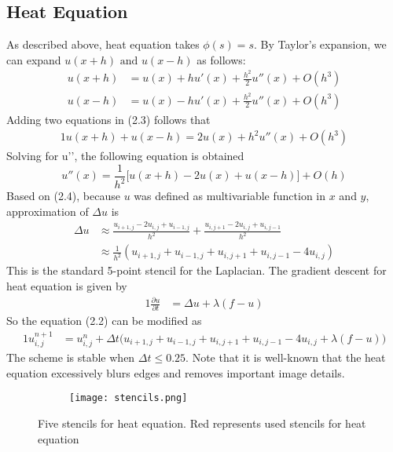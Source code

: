 \documentclass[12pt]{report}
\begin{document}
\begin{tableofcontents}
			\section{Heat Equation}
As described above, heat equation takes $\phi(s)=s$. By Taylor's expansion, we can expand $u(x+h)$ $\text{and}$ $u(x-h)$ as follows:
				\begin{equation}
                \begin{split}
\displaystyle u(x+h) &= u(x) + hu'(x) + \frac{h^2}{2}u''(x) + O(h^3) \\
\displaystyle u(x-h) &= u(x) - hu'(x) + \frac{h^2}{2}u''(x) + O(h^3)
				\end{split}
				\end{equation}
Adding two equations in (2.3) follows that
				\begin{alignat*}{1}
\displaystyle u(x+h) + u(x-h) = 2u(x) + h^2u''(x) + O(h^3)
				\end{alignat*}
Solving for u’’, the following equation is obtained
				\begin{equation}
u''(x) = \frac{1}{h^2}\Big[u(x+h) - 2u(x) + u(x-h)\Big] + O(h)
                \end{equation}
\newline
Based on (2.4), because $u$ was defined as multivariable function in $x$ and $y$, approximation of $\Delta u$ is
				\begin{equation}
                \begin{split}
      \displaystyle\Delta u &\approx \frac{u_{i+1,j}-2u_{i,j}+u_{i-1,j}}{h^2}+\frac{u_{i,j+1}-2u_{i,j}+u_{i,j-1}}{h^2}\\
              &\approx \frac{1}{h^2}(u_{i+1,j}+u_{i-1,j}+u_{i,j+1}+u_{i,j-1}-4u_{i,j})
              	\end{split}
                \end{equation}
This is the standard 5-point stencil for the Laplacian. The gradient descent for heat equation is given by
				\begin{alignat*}{1}
                \frac{\partial u}{\partial t} &= \Delta u + \lambda(f-u)
                \end{alignat*}
So the equation (2.2) can be modified as
				\begin{alignat*}{1}
                \displaystyle u_{i,j}^{n+1} &= u_{i,j}^{n} + \Delta t\big(u_{i+1,j}+u_{i-1,j}+u_{i,j+1}+u_{i,j-1}-4u_{i,j} + \lambda(f-u)\big)
                \end{alignat*}
\newline
\noindent
The scheme is stable when $\Delta t \leq 0.25$. Note that it is well-known that the heat equation excessively blurs edges and removes important image details.
            \begin{figure}[H]
				\centering
				\begin{subfigure}{0.2\textwidth}
					\texttt{[image: stencils.png]}
				\end{subfigure}
				\caption{Five stencils for heat equation. Red represents used stencils for heat equation}
			\end{figure}

\end{tableofcontents}
\end{document}
